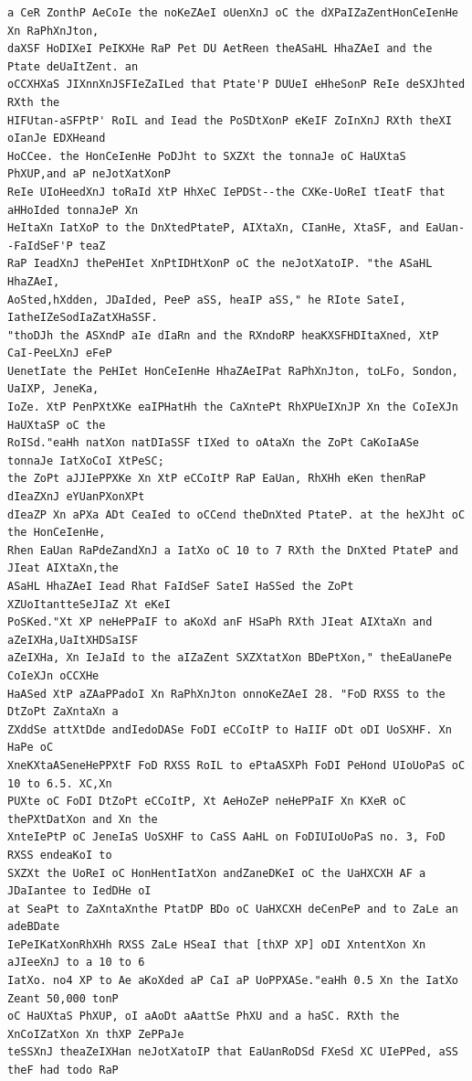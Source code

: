 \documentclass[11pt,a4paper]{article}
\begin{document}
\begin{lstlisting}[style=ciphertext,caption={Complete text after iteration 5}]
a CeR ZonthP AeCoIe the noKeZAeI oUenXnJ oC the dXPaIZaZentHonCeIenHe Xn RaPhXnJton,
daXSF HoDIXeI PeIKXHe RaP Pet DU AetReen theASaHL HhaZAeI and the Ptate deUaItZent. an
oCCXHXaS JIXnnXnJSFIeZaILed that Ptate'P DUUeI eHheSonP ReIe deSXJhted RXth the
HIFUtan-aSFPtP' RoIL and Iead the PoSDtXonP eKeIF ZoInXnJ RXth theXI oIanJe EDXHeand
HoCCee. the HonCeIenHe PoDJht to SXZXt the tonnaJe oC HaUXtaS PhXUP,and aP neJotXatXonP
ReIe UIoHeedXnJ toRaId XtP HhXeC IePDSt--the CXKe-UoReI tIeatF that aHHoIded tonnaJeP Xn
HeItaXn IatXoP to the DnXtedPtateP, AIXtaXn, CIanHe, XtaSF, and EaUan--FaIdSeF'P teaZ
RaP IeadXnJ thePeHIet XnPtIDHtXonP oC the neJotXatoIP. "the ASaHL HhaZAeI,
AoSted,hXdden, JDaIded, PeeP aSS, heaIP aSS," he RIote SateI, IatheIZeSodIaZatXHaSSF.
"thoDJh the ASXndP aIe dIaRn and the RXndoRP heaKXSFHDItaXned, XtP CaI-PeeLXnJ eFeP
UenetIate the PeHIet HonCeIenHe HhaZAeIPat RaPhXnJton, toLFo, Sondon, UaIXP, JeneKa,
IoZe. XtP PenPXtXKe eaIPHatHh the CaXntePt RhXPUeIXnJP Xn the CoIeXJn HaUXtaSP oC the
RoISd."eaHh natXon natDIaSSF tIXed to oAtaXn the ZoPt CaKoIaASe tonnaJe IatXoCoI XtPeSC;
the ZoPt aJJIePPXKe Xn XtP eCCoItP RaP EaUan, RhXHh eKen thenRaP dIeaZXnJ eYUanPXonXPt
dIeaZP Xn aPXa ADt CeaIed to oCCend theDnXted PtateP. at the heXJht oC the HonCeIenHe,
Rhen EaUan RaPdeZandXnJ a IatXo oC 10 to 7 RXth the DnXted PtateP and JIeat AIXtaXn,the
ASaHL HhaZAeI Iead Rhat FaIdSeF SateI HaSSed the ZoPt XZUoItantteSeJIaZ Xt eKeI
PoSKed."Xt XP neHePPaIF to aKoXd anF HSaPh RXth JIeat AIXtaXn and aZeIXHa,UaItXHDSaISF
aZeIXHa, Xn IeJaId to the aIZaZent SXZXtatXon BDePtXon," theEaUanePe CoIeXJn oCCXHe
HaASed XtP aZAaPPadoI Xn RaPhXnJton onnoKeZAeI 28. "FoD RXSS to the DtZoPt ZaXntaXn a
ZXddSe attXtDde andIedoDASe FoDI eCCoItP to HaIIF oDt oDI UoSXHF. Xn HaPe oC
XneKXtaASeneHePPXtF FoD RXSS RoIL to ePtaASXPh FoDI PeHond UIoUoPaS oC 10 to 6.5. XC,Xn
PUXte oC FoDI DtZoPt eCCoItP, Xt AeHoZeP neHePPaIF Xn KXeR oC thePXtDatXon and Xn the
XnteIePtP oC JeneIaS UoSXHF to CaSS AaHL on FoDIUIoUoPaS no. 3, FoD RXSS endeaKoI to
SXZXt the UoReI oC HonHentIatXon andZaneDKeI oC the UaHXCXH AF a JDaIantee to IedDHe oI
at SeaPt to ZaXntaXnthe PtatDP BDo oC UaHXCXH deCenPeP and to ZaLe an adeBDate
IePeIKatXonRhXHh RXSS ZaLe HSeaI that [thXP XP] oDI XntentXon Xn aJIeeXnJ to a 10 to 6
IatXo. no4 XP to Ae aKoXded aP CaI aP UoPPXASe."eaHh 0.5 Xn the IatXo Zeant 50,000 tonP
oC HaUXtaS PhXUP, oI aAoDt aAattSe PhXU and a haSC. RXth the XnCoIZatXon Xn thXP ZePPaJe
teSSXnJ theaZeIXHan neJotXatoIP that EaUanRoDSd FXeSd XC UIePPed, aSS theF had todo RaP

\end{lstlisting}
\end{document}
